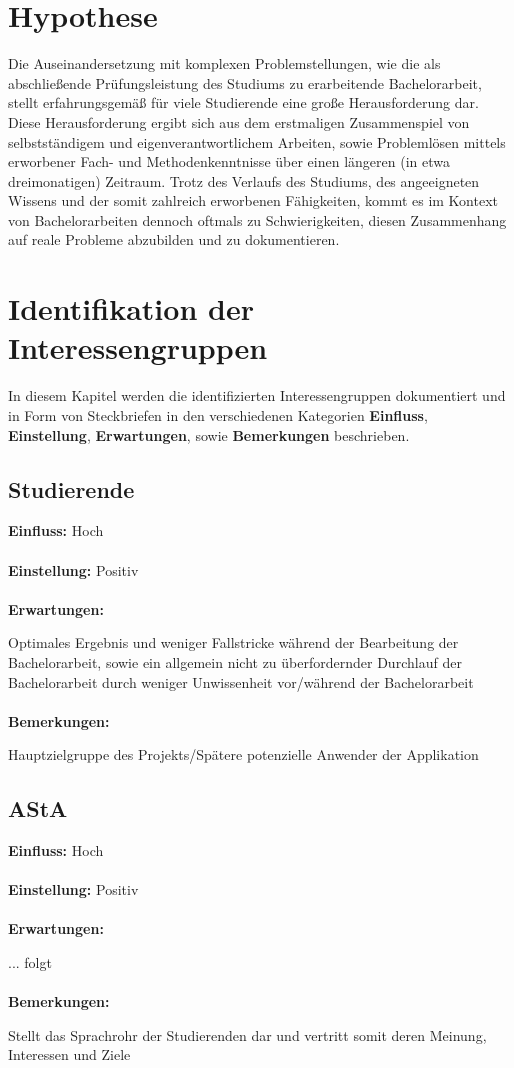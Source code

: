 \documentclass{scrreprt}
\begin{document}
\section{Hypothese}
\par Die Auseinandersetzung mit komplexen Problemstellungen, wie die als abschließende Prüfungsleistung des Studiums zu erarbeitende Bachelorarbeit, stellt erfahrungsgemäß für viele Studierende eine große Herausforderung dar. Diese Herausforderung ergibt sich aus dem erstmaligen Zusammenspiel von selbstständigem und eigenverantwortlichem Arbeiten, sowie Problemlösen mittels erworbener Fach- und Methodenkenntnisse über einen längeren (in etwa dreimonatigen) Zeitraum.
Trotz des Verlaufs des Studiums, des angeeigneten Wissens und der somit zahlreich erworbenen Fähigkeiten, kommt es im Kontext von Bachelorarbeiten dennoch oftmals zu Schwierigkeiten, diesen Zusammenhang auf reale Probleme abzubilden und zu dokumentieren.

\section{Identifikation der Interessengruppen}
\par In diesem Kapitel werden die identifizierten Interessengruppen dokumentiert und in Form von Steckbriefen in den verschiedenen Kategorien \textbf{Einfluss}, \textbf{Einstellung}, \textbf{Erwartungen}, sowie \textbf{Bemerkungen} beschrieben.  
\subsection{Studierende}
\textbf{Einfluss:} Hoch\\\\
\textbf{Einstellung:} Positiv\\\\
\textbf{Erwartungen:}\par Optimales Ergebnis und weniger \glqq Fallstricke\grqq{} während der Bearbeitung der Bachelorarbeit, sowie ein allgemein \glqq nicht zu überfordernder\grqq{} Durchlauf der Bachelorarbeit durch weniger Unwissenheit vor/während der Bachelorarbeit\\\\
\textbf{Bemerkungen:}\par Hauptzielgruppe des Projekts/Spätere potenzielle Anwender der Applikation

\subsection{AStA}
\textbf{Einfluss:} Hoch\\\\
\textbf{Einstellung:} Positiv\\\\
\textbf{Erwartungen:}\par ... folgt\\\\
\textbf{Bemerkungen:}\par Stellt das Sprachrohr der Studierenden dar und vertritt somit deren Meinung, Interessen und Ziele
\newpage
\end{document}
